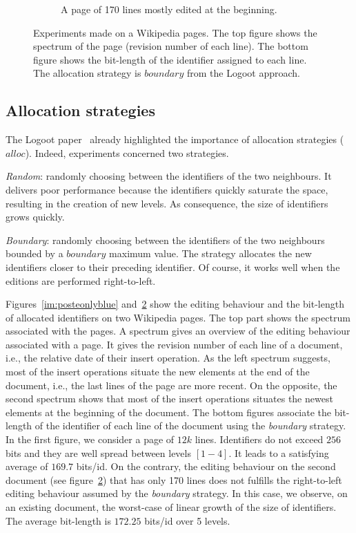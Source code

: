 \begin{figure}
\begin{subfigure}[t]{0.5\textwidth}
\caption{A page of 170 lines mostly edited at the beginning.}
\label{im:didyouknowonlyblue}
\end{subfigure}
\caption{Experiments made on a Wikipedia pages. The top figure shows the
  spectrum of the page (revision number of each line). The bottom figure shows
  the bit-length of the identifier assigned to each line. The allocation
  strategy is $boundary$ from the Logoot approach.}
\end{figure}

\subsection{Allocation strategies}
The Logoot paper~\cite{weiss2009logoot} already highlighted the importance of
allocation strategies ($alloc$). Indeed, experiments concerned two strategies.
\begin{inparaenum}[(1)]
\item \emph{Random}: randomly choosing between the identifiers of the two
  neighbours. It delivers poor performance because the identifiers quickly
  saturate the space, resulting in the creation of new levels. As consequence,
  the size of identifiers grows quickly.
\item \emph{Boundary}: randomly choosing between the identifiers of the two
  neighbours bounded by a $boundary$ maximum value. The strategy allocates the
  new identifiers closer to their preceding identifier. Of course, it works
  well when the editions are performed right-to-left.
\end{inparaenum}

Figures~\ref{im:posteonlyblue} and~\ref{im:didyouknowonlyblue} show the editing
behaviour and the bit-length of allocated identifiers on two Wikipedia
pages. The top part shows the spectrum associated with the pages. A spectrum
gives an overview of the editing behaviour associated with a page. It gives the
revision number of each line of a document, i.e., the relative date of their
insert operation.  As the left spectrum suggests, most of the insert operations
situate the new elements at the end of the document, i.e., the last lines of
the page are more recent. On the opposite, the second spectrum shows that most
of the insert operations situates the newest elements at the beginning of the
document.  The bottom figures associate the bit-length of the identifier of
each line of the document using the \emph{boundary} strategy. In the first
figure, we consider a page of $12k$ lines. Identifiers do not exceed $256$ bits
and they are well spread between levels $[1-4]$. It leads to a satisfying
average of $169.7$ bits/id. On the contrary, the editing behaviour on the
second document (see figure~\ref{im:didyouknowonlyblue}) that has only 170
lines does not fulfills the right-to-left editing behaviour assumed by the
\emph{boundary} strategy. In this case, we observe, on an existing document,
the worst-case of linear growth of the size of identifiers.  The average
bit-length is $172.25$ bits/id over 5 levels.


